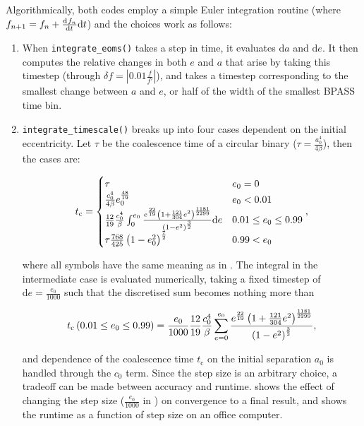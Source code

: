 Algorithmically, both codes employ a simple Euler integration routine (where $f_{n+1} = f_{n} + \dv{f_n}{t}\mathrm{d}t$) and the choices work as follows:

\begin{enumerate}
    \item When \texttt{integrate_eoms()} takes a step in time, it evaluates $\mathrm{d}a$ and $\mathrm{d}e$. It then computes the relative changes in both $e$ and $a$ that arise by taking this timestep (through $\delta f = \left|0.01\frac{f}{f'}\right|$), and takes a timestep corresponding to the smallest change between $a$ and $e$, or half of the width of the smallest BPASS time bin.
    \item \texttt{integrate_timescale()} breaks up  into four cases dependent on the initial eccentricity. Let $\tau$ be the coalescence time of a circular binary ($\tau=\frac{a_0^4}{4\beta}$), then the cases are:

    \begin{equation}
        t_\text{c} = \begin{cases}
            \tau & e_0 = 0 \\
            \frac{c_0^4}{4\beta} e_0^\frac{48}{19} & e_0 < 0.01 \\
            \frac{12}{19}\frac{c_0^4}{\beta}\int_0^{e_0} \frac{e^\frac{22}{19}\left(1+\frac{121}{304}e^2\right)^\frac{1181}{2299}}{\left(1-e^2\right)^\frac32}{ \mathrm{d}e} & 0.01 \leq e_0 \leq 0.99 \\
            \tau \frac{768}{425}\left(1-e_0^2\right)^\frac72 & 0.99 < e_0
        \end{cases},
    \end{equation}

    where all symbols have the same meaning as in . The integral in the intermediate case is evaluated numerically, taking a fixed timestep of $\mathrm{d}e=\frac{e_0}{1000}$ such that the discretised sum becomes nothing more than

    \begin{equation}
        t_\text{c}\left(0.01\leq e_0\leq 0.99\right) = \frac{e_0}{1000}\frac{12}{19}\frac{c_0^4}{\beta}\sum_{e=0}^{e_0} \frac{e^\frac{22}{19}\left(1+\frac{121}{304}e^2\right)^\frac{1181}{2299}}{\left(1-e^2\right)^\frac32},\label{eq:discrete_sum}
    \end{equation}

    and dependence of the coalescence time $t_\text{c}$ on the initial separation $a_0$ is handled through the $c_0$ term. Since the step size is an arbitrary choice, a tradeoff can be made between accuracy and runtime.  shows the effect of changing the step size ($\frac{e_0}{1000}$ in ) on convergence to a final result, and  shows the runtime as a function of step size on an office computer.
\end{enumerate}

